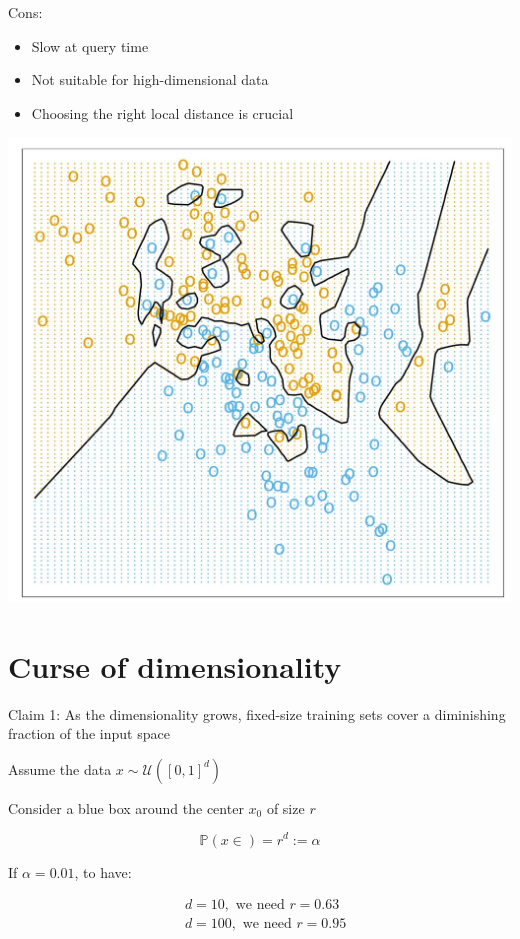 \documentclass[10pt]{article}
\begin{document}
Cons:

\begin{itemize}
  \item Slow at query time
  \item Not suitable for high-dimensional data
  \item Choosing the right local distance is crucial
\end{itemize}

\begin{center}
\includegraphics[max width=\textwidth]{2023_12_30_f937b0007b5d87b39f79g-25}
\end{center}

\section*{Curse of dimensionality}
Claim 1: As the dimensionality grows, fixed-size training sets cover a diminishing fraction of the input space

Assume the data $x \sim \mathcal{U}\left([0,1]^{d}\right)$

Consider a blue box around the center $x_{0}$ of size $r$

$$
\mathbb{P}(x \in)=r^{d}:=\alpha
$$

If $\alpha=0.01$, to have:

$$
\begin{aligned}
& d=10, \text { we need } r=0.63 \\
& d=100, \text { we need } r=0.95
\end{aligned}
$$
\end{document}
